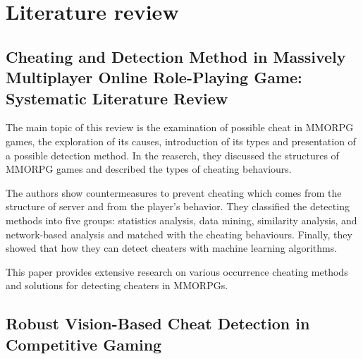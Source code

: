 \chapter{Literature review}
\label{ch:lit_rev}

\section{Cheating and Detection Method in Massively Multiplayer Online Role-Playing Game: Systematic Literature Review \cite{9766355}}

The main topic of this review is the examination of possible cheat in MMORPG games, the exploration of its causes, introduction of its types and presentation of a possible detection method.
In the reaserch, they discussed the structures of MMORPG games and described the types of cheating behaviours.

The authors show countermeasures to prevent cheating which comes from the structure of server and from the player's behavior.
They classified the detecting methods into five groups: statistics analysis, data mining, similarity analysis, and network-based analysis and matched with the cheating behaviours.
Finally, they showed that how they can detect cheaters with machine learning algorithms.

This paper provides extensive research on various occurrence cheating methods and solutions for detecting cheaters in MMORPGs.

\section{Robust Vision-Based Cheat Detection in Competitive Gaming \cite{jonnalagadda2021robust}}

